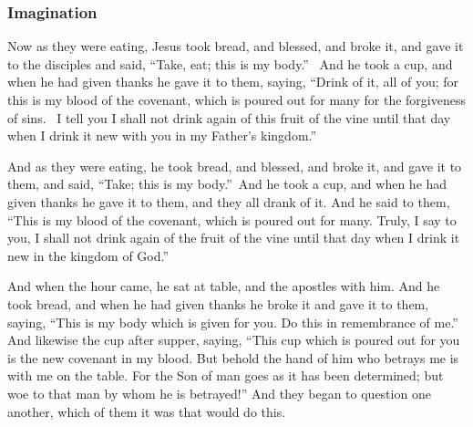 \subsubsection*{Imagination}
\begin{multicols}{2}\small
Now as they were eating, Jesus took bread, and blessed, and broke it, and gave it to the disciples and said,
“Take, eat; this is my body.”  And he took a cup, and when he had given thanks he gave it to them, saying, “Drink of it,
all of you; for this is my blood of the covenant, which is poured out for many for the forgiveness of sins.  I tell you
I shall not drink again of this fruit of the vine until that day when I drink it new with you in my
Father's kingdom.” 

And as they were eating, he took bread, and blessed, and broke it, and gave it to them, and said, “Take; this is
my body.” And he took a cup, and when he had given thanks he gave it to them, and they all drank of it. And he said to
them, “This is my blood of the covenant, which is poured out for many. Truly, I say to you, I shall not drink again of
the fruit of the vine until that day when I drink it new in the kingdom of God.”  

And when the hour came, he sat at table, and the apostles with him. And he took bread, and when he had given
thanks he broke it and gave it to them, saying, “This is my body which is given for you. Do this in remembrance of me.”
And likewise the cup after supper, saying, “This cup which is poured out for you is the new covenant in my blood. But
behold the hand of him who betrays me is with me on the table. For the Son of man goes as it has been determined; but
woe to that man by whom he is betrayed!” And they began to question one another, which of them it was that would do
this.  
\end{multicols}

